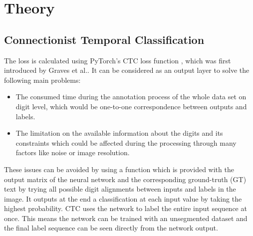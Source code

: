 \section{Theory}\label{sec:theory}
\subsection{Connectionist Temporal Classification}\label{subsec:ctc}

The loss is calculated using PyTorch's CTC loss function \cite{pytorch_ctc},
which was first introduced by Graves et al.\cite{CTC}. It can be considered as
an output layer to solve the following main problems:
\begin{itemize}
\item The consumed time during the annotation process of the whole data set on
digit level, which would be one-to-one correspondence between outputs and
labels.
\item The limitation on the available information about the digits and its
constraints which could be affected during the processing through many factors
like noise or image resolution.
\end{itemize}
These issues can be avoided by using a function which is provided with the
output matrix of the neural network and the corresponding ground-truth (GT) text
by trying all possible digit alignments between inputs and labels in the image.
It outputs at the end a classification at each input value by taking the highest
probability. CTC uses the network to label the entire input sequence at once.
This means the network can be trained with an unsegmented dataset and the final
label sequence can be seen directly from the network output. 

